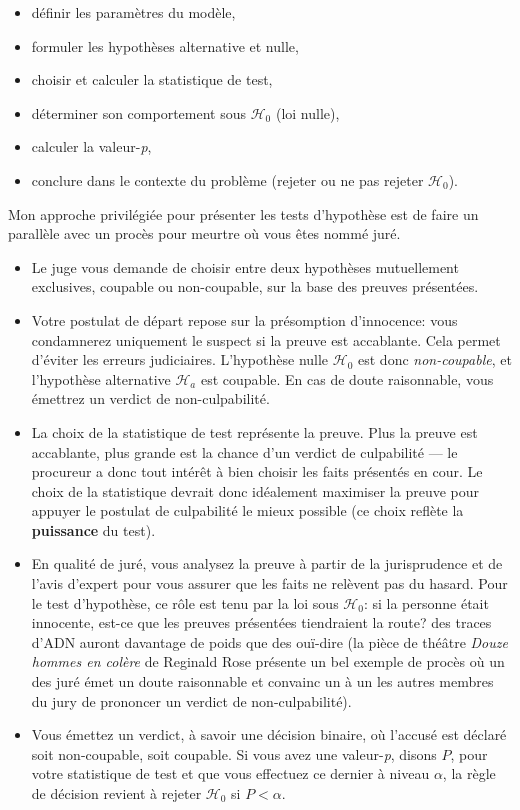\documentclass[
  11pt,
  letterpaper,
]{article}
\providecommand{\tightlist}{%
  \setlength{\itemsep}{0pt}\setlength{\parskip}{0pt}}
\theoremstyle{definition}
\theoremstyle{definition}
\theoremstyle{definition}
\theoremstyle{definition}
\theoremstyle{remark}
\begin{document}
\begin{itemize}
\tightlist
\item
  définir les paramètres du modèle,
\item
  formuler les hypothèses alternative et nulle,
\item
  choisir et calculer la statistique de test,
\item
  déterminer son comportement sous \(\mathscr{H}_0\) (loi nulle),
\item
  calculer la valeur-\emph{p},
\item
  conclure dans le contexte du problème (rejeter ou ne pas rejeter \(\mathscr{H}_0\)).
\end{itemize}

Mon approche privilégiée pour présenter les tests d'hypothèse est de faire un parallèle avec un procès pour meurtre où vous êtes nommé juré.

\begin{itemize}
\tightlist
\item
  Le juge vous demande de choisir entre deux hypothèses mutuellement exclusives, coupable ou non-coupable, sur la base des preuves présentées.
\item
  Votre postulat de départ repose sur la présomption d'innocence: vous condamnerez uniquement le suspect si la preuve est accablante. Cela permet d'éviter les erreurs judiciaires. L'hypothèse nulle \(\mathscr{H}_0\) est donc \emph{non-coupable}, et l'hypothèse alternative \(\mathscr{H}_a\) est coupable. En cas de doute raisonnable, vous émettrez un verdict de non-culpabilité.
\item
  La choix de la statistique de test représente la preuve. Plus la preuve est accablante, plus grande est la chance d'un verdict de culpabilité --- le procureur a donc tout intérêt à bien choisir les faits présentés en cour. Le choix de la statistique devrait donc idéalement maximiser la preuve pour appuyer le postulat de culpabilité le mieux possible (ce choix reflète la \textbf{puissance} du test).
\item
  En qualité de juré, vous analysez la preuve à partir de la jurisprudence et de l'avis d'expert pour vous assurer que les faits ne relèvent pas du hasard. Pour le test d'hypothèse, ce rôle est tenu par la loi sous \(\mathscr{H}_0\): si la personne était innocente, est-ce que les preuves présentées tiendraient la route? des traces d'ADN auront davantage de poids que des ouï-dire (la pièce de théâtre \emph{Douze hommes en colère} de Reginald Rose présente un bel exemple de procès où un des juré émet un doute raisonnable et convainc un à un les autres membres du jury de prononcer un verdict de non-culpabilité).
\item
  Vous émettez un verdict, à savoir une décision binaire, où l'accusé est déclaré soit non-coupable, soit coupable. Si vous avez une valeur-\emph{p}, disons \(P\), pour votre statistique de test et que vous effectuez ce dernier à niveau \(\alpha\), la règle de décision revient à rejeter \(\mathscr{H}_0\) si \(P < \alpha\).
\end{itemize}
\end{document}
